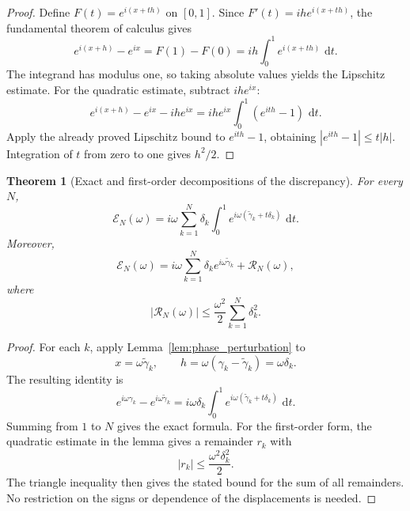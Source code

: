 \documentclass[11pt]{amsart}
\numberwithin{equation}{section}
\theoremstyle{plain}
\newtheorem{theorem}{Theorem}[section]
\theoremstyle{definition}
\theoremstyle{remark}
\newcommand{\1}{\mathbf{1}}
\newcommand{\dd}{\,\mathrm{d}}
\begin{document}
\begin{proof}
Define \(F(t)=e^{i(x+th)}\) on \([0,1]\).  Since
\(F'(t)=ihe^{i(x+th)}\), the fundamental theorem of calculus gives
\begin{equation}
e^{i(x+h)}-e^{ix}
=
F(1)-F(0)
=
ih\int_0^1e^{i(x+th)}\,\dd t.
\label{eq:phase_perturbation_ftc_detailed}
\end{equation}
The integrand has modulus one, so taking absolute values yields the
Lipschitz estimate.  For the quadratic estimate, subtract \(ihe^{ix}\):
\begin{equation}
e^{i(x+h)}-e^{ix}-ihe^{ix}
=
ihe^{ix}\int_0^1(e^{ith}-1)\,\dd t.
\label{eq:phase_quadratic_identity_detailed}
\end{equation}
Apply the already proved Lipschitz bound to \(e^{ith}-1\), obtaining
\(|e^{ith}-1|\leq t|h|\).  Integration of \(t\) from zero to one gives
\(h^2/2\).
\end{proof}

\begin{theorem}[Exact and first-order decompositions of the discrepancy]
\label{thm:indexed_discrepancy_decomposition}
For every \(N\),
\begin{equation}
\mathcal E_N(\omega)
=
i\omega
\sum_{k=1}^{N}
\delta_k
\int_0^1
 e^{i\omega(\widetilde\gamma_k+t\delta_k)}\,\dd t.
\label{eq:exact_indexed_discrepancy}
\end{equation}
Moreover,
\begin{equation}
\mathcal E_N(\omega)
=
i\omega\sum_{k=1}^{N}
\delta_ke^{i\omega\widetilde\gamma_k}
+
\mathcal R_N(\omega),
\label{eq:first_order_indexed_discrepancy}
\end{equation}
where
\begin{equation}
|\mathcal R_N(\omega)|
\leq
\frac{\omega^2}{2}
\sum_{k=1}^{N}\delta_k^2.
\label{eq:indexed_discrepancy_remainder}
\end{equation}
\end{theorem}

\begin{proof}
For each \(k\), apply Lemma~\ref{lem:phase_perturbation} to
\begin{equation}
x=\omega\widetilde\gamma_k,
\qquad
h=\omega(\gamma_k-\widetilde\gamma_k)=\omega\delta_k.
\label{eq:indexed_discrepancy_substitution}
\end{equation}
The resulting identity is
\begin{equation}
e^{i\omega\gamma_k}-e^{i\omega\widetilde\gamma_k}
=
i\omega\delta_k
\int_0^1e^{i\omega(\widetilde\gamma_k+t\delta_k)}\,\dd t.
\label{eq:indexed_discrepancy_termwise}
\end{equation}
Summing from \(1\) to \(N\) gives the exact formula.  For the first-order
form, the quadratic estimate in the lemma gives a remainder \(r_k\) with
\begin{equation}
|r_k|\leq\frac{\omega^2\delta_k^2}{2}.
\label{eq:indexed_term_remainder_bound}
\end{equation}
The triangle inequality then gives the stated bound for the sum of all
remainders.  No restriction on the signs or dependence of the displacements
is needed.
\end{proof}
\end{document}
